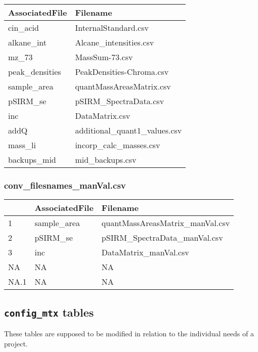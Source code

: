 \documentclass[]{book}
\begin{document}
\begin{tabu} to 
\toprule
AssociatedFile & Filename\\
\midrule
{}  cin\_acid & InternalStandard.csv\\
alkane\_int & Alcane\_intensities.csv\\
  mz\_73 & MassSum-73.csv\\
peak\_densities & PeakDensities-Chroma.csv\\
  sample\_area & quantMassAreasMatrix.csv\\
\addlinespace
pSIRM\_se & pSIRM\_SpectraData.csv\\
  inc & DataMatrix.csv\\
addQ & additional\_quant1\_values.csv\\
  mass\_li & incorp\_calc\_masses.csv\\
backups\_mid & mid\_backups.csv\\
\bottomrule
\end{tabu}

\hypertarget{filenamesManVal}{%
\subsubsection{conv\_filesnames\_manVal.csv}\label{filenamesManVal}}

\begin{tabu} to 
\toprule
  & AssociatedFile & Filename\\
\midrule
{}  1 & sample\_area & quantMassAreasMatrix\_manVal.csv\\
2 & pSIRM\_se & pSIRM\_SpectraData\_manVal.csv\\
  3 & inc & DataMatrix\_manVal.csv\\
NA & NA & NA\\
  NA.1 & NA & NA\\
\bottomrule
\end{tabu}

\hypertarget{config_mtx-tables}{%
\subsection{\texorpdfstring{\texttt{config\_mtx} tables}{config\_mtx tables}}\label{config_mtx-tables}}

These tables are supposed to be modified in relation to the individual needs of a project.
\end{document}
